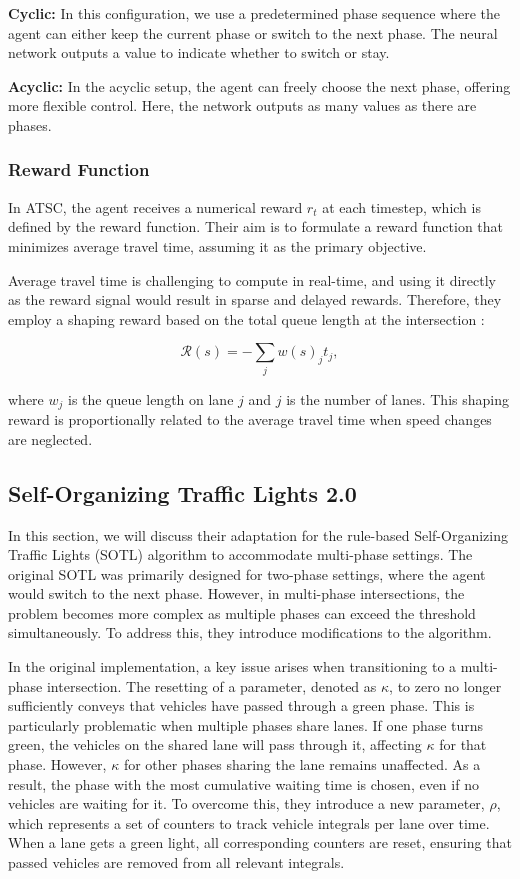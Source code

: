 \textbf{Cyclic:} In this configuration, we use a predetermined phase sequence where the agent can either keep the current phase or switch to the next phase. The neural network outputs a value to indicate whether to switch or stay.

\textbf{Acyclic:} In the acyclic setup, the agent can freely choose the next phase, offering more flexible control. Here, the network outputs as many values as there are phases.

\subsubsection{Reward Function}
\label{sec:reward_function}

In ATSC, the agent receives a numerical reward \(r_t\) at each timestep, which is defined by the reward function. Their aim is to formulate a reward function that minimizes average travel time, assuming it as the primary objective.

Average travel time is challenging to compute in real-time, and using it directly as the reward signal would result in sparse and delayed rewards. Therefore, they employ a shaping reward based on the total queue length at the intersection \cite{zheng2019diagnosing}:

\[
\mathcal{R}(s) = - \sum_j w(s)_j t_j,
\]

where \(w_j\) is the queue length on lane \(j\) and \(j\) is the number of lanes. This shaping reward is proportionally related to the average travel time when speed changes are neglected.

\subsection{Self-Organizing Traffic Lights 2.0}
\label{sec:sotl_2.0}

In this section, we will discuss their adaptation for the rule-based Self-Organizing Traffic Lights (SOTL) algorithm to accommodate multi-phase settings. The original SOTL was primarily designed for two-phase settings, where the agent would switch to the next phase. However, in multi-phase intersections, the problem becomes more complex as multiple phases can exceed the threshold simultaneously. To address this, they introduce modifications to the algorithm.

In the original implementation, a key issue arises when transitioning to a multi-phase intersection. The resetting of a parameter, denoted as \(\kappa\), to zero no longer sufficiently conveys that vehicles have passed through a green phase. This is particularly problematic when multiple phases share lanes. If one phase turns green, the vehicles on the shared lane will pass through it, affecting \(\kappa\) for that phase. However, \(\kappa\) for other phases sharing the lane remains unaffected. As a result, the phase with the most cumulative waiting time is chosen, even if no vehicles are waiting for it. To overcome this, they introduce a new parameter, \(\rho\), which represents a set of counters to track vehicle integrals per lane over time. When a lane gets a green light, all corresponding counters are reset, ensuring that passed vehicles are removed from all relevant integrals.


